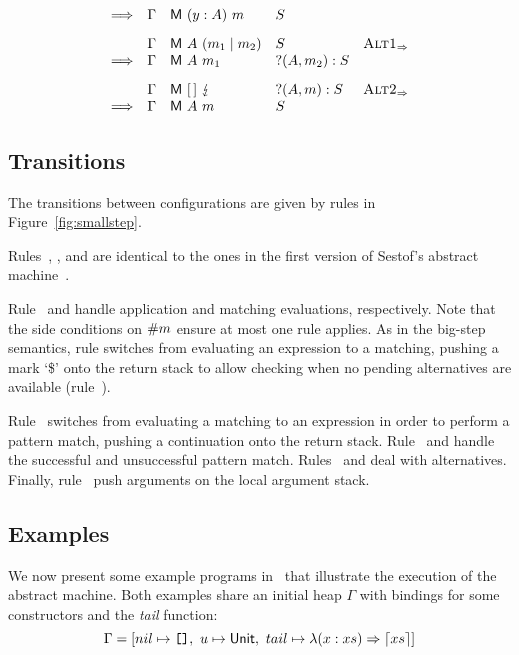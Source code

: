 \begin{figure*}
\[\begin{array}{rllll}
      \Longrightarrow & \Gamma & \textsf{M}~(y:A)~m  & S \\[2ex]
      & \Gamma & \textsf{M}~A~(m_1 \mid m_2) & S & \textsc{Alt1}_{\Rightarrow} \\
      \Longrightarrow & \Gamma & \textsf{M}~A~m_1   &?(A,m_2):S & \\[2ex]
  & \Gamma & \textsf{M}~[\,]~\lightning  & ?(A,m):S & \textsc{Alt2}_{\Rightarrow} \\
  \Longrightarrow & \Gamma & \textsf{M}~A~m  & S 
    \end{array}
  \]
    
  
  \caption{Abstract machine transition rules}\label{fig:smallstep}
\end{figure*}

\subsection{Transitions}

The transitions between configurations are given by rules in
Figure~\ref{fig:smallstep}.

Rules~, , 
and  are identical to the ones in the first version of
Sestof's abstract machine~\cite{sestof_1997}.

Rule~ and  handle application
and matching evaluations, respectively. Note that the
side conditions on $\#{m}$ ensure at most one
rule applies.
As in the big-step semantics, rule  switches
from evaluating an expression to a
matching, pushing a mark `\$' onto the return stack
to allow checking when no pending alternatives
are available (rule~).

Rule~ switches from evaluating a matching
to an expression in order to perform a pattern match, pushing
a continuation onto the return stack.
Rule~ and  handle
the successful and unsuccessful pattern match.
Rules~ and  deal
with alternatives.
Finally, rule~ push arguments on the local argument stack.

\subsection{Examples}

We now present some example programs in \lambdaPMC\ that illustrate
the execution of the abstract machine.  Both examples share an
initial heap $\Gamma$ with bindings for some constructors
and the \textit{tail} function:
\[
  \Gamma = [ nil \mapsto \texttt{[]},\ u \mapsto \textsf{Unit},\ tail \mapsto \lambda(x : xs) \Rightarrow \left\lceil xs\right\rceil ]
\]

